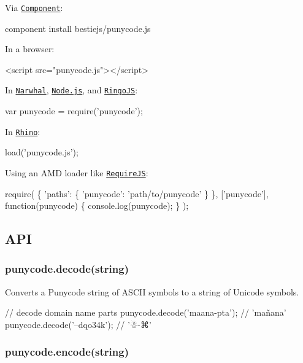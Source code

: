 Via \href{https://github.com/component/component}{\tt Component}\+:


\begin{DoxyCode}
component install bestiejs/punycode.js
\end{DoxyCode}


In a browser\+:


\begin{DoxyCode}
<script src="punycode.js"></script>
\end{DoxyCode}


In \href{http://narwhaljs.org/}{\tt Narwhal}, \href{http://nodejs.org/}{\tt Node.\+js}, and \href{http://ringojs.org/}{\tt Ringo\+JS}\+:


\begin{DoxyCode}
var punycode = require('punycode');
\end{DoxyCode}


In \href{http://www.mozilla.org/rhino/}{\tt Rhino}\+:


\begin{DoxyCode}
load('punycode.js');
\end{DoxyCode}


Using an A\+MD loader like \href{http://requirejs.org/}{\tt Require\+JS}\+:


\begin{DoxyCode}
require(
  \{
    'paths': \{
      'punycode': 'path/to/punycode'
    \}
  \},
  ['punycode'],
  function(punycode) \{
    console.log(punycode);
  \}
);
\end{DoxyCode}


\subsection*{A\+PI}

\subsubsection*{{\ttfamily punycode.\+decode(string)}}

Converts a Punycode string of A\+S\+C\+II symbols to a string of Unicode symbols.


\begin{DoxyCode}
// decode domain name parts
punycode.decode('maana-pta'); // 'mañana'
punycode.decode('--dqo34k'); // '☃-⌘'
\end{DoxyCode}


\subsubsection*{{\ttfamily punycode.\+encode(string)}}

